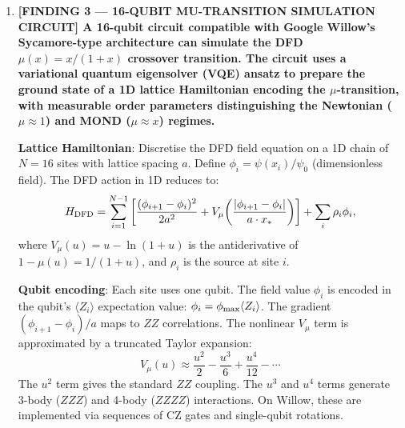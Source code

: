 \documentclass[11pt]{article}
\theoremstyle{definition}
\theoremstyle{remark}
\begin{document}
\begin{tcolorbox}[colback=blue!5!white, colframe=blue!60!black,
  title=\textbf{W4i17 TOP 5 FINDINGS --- READ FIRST}]
\begin{enumerate}[nosep]
  \textbf{Timeline impact}: If $67^K$ works and cat-qubits become standard,
  the fault-tolerant threshold date advances by an estimated 3--5 years
  (from $\sim$2035 to $\sim$2030--2032), because the qubit count
  requirement drops by $2$--$7\times$. The primary bottleneck shifts from
  ``build millions of qubits'' to ``control thousands of cat qubits with
  psi-modulation.'' This makes the engineering challenge more tractable
  but introduces a new requirement: every physical qubit needs a
  psi-modulation drive channel, increasing the microwave control
  complexity per qubit.

  \textbf{Patent implication}: If confirmed, P3's psi-modulation IP
  becomes foundational for fault-tolerant quantum computing. The
  commercial value is not in selling quantum computers, but in licensing
  the psi-modulation technique to quantum hardware companies (Google,
  IBM, Alice\&Bob, PsiQuantum).

\item \textbf{[FINDING 3 --- 16-QUBIT MU-TRANSITION SIMULATION CIRCUIT]
  A 16-qubit circuit compatible with Google Willow's Sycamore-type
  architecture can simulate the DFD $\mu(x) = x/(1+x)$ crossover
  transition. The circuit uses a variational quantum eigensolver (VQE)
  ansatz to prepare the ground state of a 1D lattice Hamiltonian
  encoding the $\mu$-transition, with measurable order parameters
  distinguishing the Newtonian ($\mu \approx 1$) and MOND
  ($\mu \approx x$) regimes.}

  \textbf{Lattice Hamiltonian}: Discretise the DFD field equation on a
  1D chain of $N = 16$ sites with lattice spacing $a$. Define
  $\phi_i = \psi(x_i)/\psi_0$ (dimensionless field). The DFD action
  in 1D reduces to:
  \begin{equation}
    H_{\rm DFD} = \sum_{i=1}^{N-1} \left[
      \frac{(\phi_{i+1} - \phi_i)^2}{2a^2}
      + V_\mu\!\left(\frac{|\phi_{i+1} - \phi_i|}{a \cdot x_*}\right)
    \right]
    + \sum_i \rho_i \phi_i,
    \label{eq:H-lattice}
  \end{equation}
  where $V_\mu(u) = u - \ln(1 + u)$ is the antiderivative of
  $1 - \mu(u) = 1/(1+u)$, and $\rho_i$ is the source at site $i$.

  \textbf{Qubit encoding}: Each site uses one qubit. The field value
  $\phi_i$ is encoded in the qubit's $\langle Z_i \rangle$ expectation
  value: $\phi_i = \phi_{\rm max} \langle Z_i \rangle$. The gradient
  $(\phi_{i+1} - \phi_i)/a$ maps to $ZZ$ correlations. The nonlinear
  $V_\mu$ term is approximated by a truncated Taylor expansion:
  \begin{equation}
    V_\mu(u) \approx \frac{u^2}{2} - \frac{u^3}{6} + \frac{u^4}{12}
    - \cdots
  \end{equation}
  The $u^2$ term gives the standard $ZZ$ coupling. The $u^3$ and $u^4$
  terms generate 3-body ($ZZZ$) and 4-body ($ZZZZ$) interactions. On
  Willow, these are implemented via sequences of CZ gates and
  single-qubit rotations.


\end{enumerate}
\end{tcolorbox}
\end{document}

